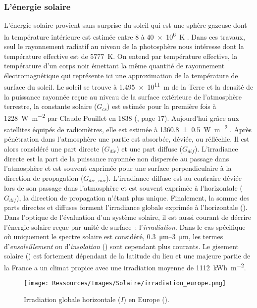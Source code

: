 \subsubsection{L’énergie solaire} %
\label{ssub:l_energie_solaire}
L’énergie solaire provient sans surprise du soleil qui est une sphère gazeuse dont la
température intérieure est estimée entre \num{8} à \SI{40e6}{\kelvin}
\parencite{Duffie1980}. Dans ces travaux, seul le rayonnement radiatif au niveau de la
photosphère nous intéresse dont la température effective est de \SI{5777}{\kelvin}. On
entend par température effective, la température d’un corps noir émettant la même quantité
de rayonnement électromagnétique qui représente ici une approximation de la température de
surface du soleil. Le soleil se trouve à \SI{1.495e11}{\metre} de la Terre et la densité
de la puissance rayonnée reçue au niveau de la surface extérieure de l’atmosphère
terrestre, la constante solaire ($G_{cs}$) est estimée pour la première fois à \SI{1228}{\watt\per\metre\squared}
par Claude Pouillet en $1838$ (\cite{Coulson2012}, page $17$). Aujourd’hui grâce aux satellites équipés de radiomètres,
elle est estimée à \SI{1360.8 +- 0.5}{\watt\per\metre\squared} \parencite{Kopp2011}. Après
pénétration dans l’atmosphère une partie est absorbée, déviée, ou réfléchie. Il est alors
considéré une part directe ($G_{dir}$) et une part diffuse ($G_{dif}$). L’irradiance
directe est la part de la puissance rayonnée non dispersée au passage dans l’atmosphère et
est souvent exprimée pour une surface perpendiculaire à la direction de propagation
($G_{dir,\,nor}$). L’irradiance diffuse est au contraire déviée lors de son passage dans
l’atmosphère et est souvent exprimée à l’horizontale ($G_{dif}$), la direction de
propagation n’étant plus unique. Finalement, la somme des parts directes et diffuses
forment l’irradiance globale exprimée à l’horizontale (). Dans l’optique de
l’évaluation d’un système solaire, il est aussi courant de décrire l’énergie solaire reçue
par unité de surface~: l’\textit{irradiation}. Dans le cas spécifique où uniquement le spectre solaire est considéré,
\SIrange{0.3}{3}{\micro\metre}, les termes d’\textit{ensoleillement} ou d’\textit{insolation} () sont
cependant plus courants.
Le gisement solaire () est fortement dépendant de la latitude du lieu et une majeure partie
de la France a un climat propice avec une irradiation moyenne de \SI{1112}{kWh\per\metre\squared}.

\begin{figure}
    \centering
    \texttt{[image: Ressources/Images/Solaire/irradiation\_europe.png]}
    \caption[Irradiation globale horizontale en Europe]
            {Irradiation globale horizontale ($I$) en Europe ().}
    \label{fig:gisement_solaire}
\end{figure}


